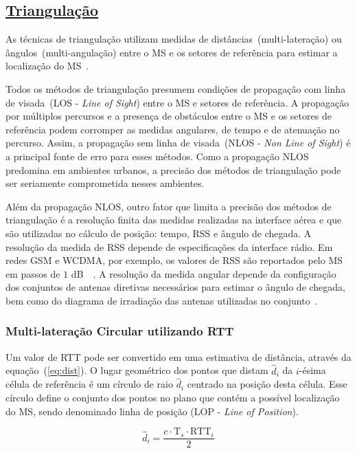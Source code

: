 \subsection{\underline{Triangulação}}
\label{subsec:Cap1Triangulacao}

As técnicas de triangulação utilizam medidas de distâncias~(multi-lateração) ou ângulos~(multi-angulação) entre o MS e os setores de referência para estimar a localização do MS~\cite{LocationMethodsSurvey2007}.

Todos os métodos de triangulação presumem condições de propagação com linha de visada~(LOS - \textit{Line of Sight}) entre o MS e setores de referência. A propagação por múltiplos percursos e a presença de obstáculos entre o MS e os setores de referência podem corromper as medidas angulares, de tempo e de atenuação no percurso. Assim, a propagação sem linha de visada~(NLOS - \textit{Non Line of Sight}) é a principal fonte de erro para esses métodos. Como a propagação NLOS predomina em ambientes urbanos, a precisão dos métodos de triangulação pode ser seriamente comprometida nesses ambientes.

Além da propagação NLOS, outro fator que limita a precisão dos métodos de triangulação é a resolução finita das medidas realizadas na interface aérea e que são utilizadas no cálculo de posição: tempo, RSS e ângulo de chegada. A resolução da medida de RSS depende de especificações da interface rádio. Em redes GSM e WCDMA, por exemplo, os valores de RSS são reportados pelo MS em passos de $1$ dB~\cite{ETSI100911}~\cite{3GPP25133}. A resolução da medida angular depende da configuração dos conjuntos de antenas diretivas necessários para estimar o ângulo de chegada, bem como do diagrama de irradiação das antenas utilizadas no conjunto~\cite{Rappaport1997}.

\subsubsection{Multi-lateração Circular utilizando RTT}
Um valor de RTT pode ser convertido em uma estimativa de distância, através da equação~(\ref{eq:dist}). O lugar geométrico dos pontos que distam $\hat{d}_{i}$ da $i$-ésima célula de referência é um círculo de raio $\hat{d}_{i}$ centrado na posição desta célula. Esse círculo define o conjunto dos pontos no plano que contém a possível localização do MS, sendo denominado linha de posição (LOP - \textit{Line of Position}).

\begin{equation}
\label{eq:dist}
\hat{d}_{i}= \frac{c \cdot \textrm{T}_{s} \cdot \textrm{RTT}_{i}}{2}
\end{equation}

